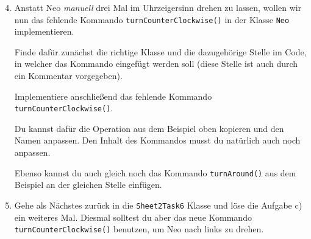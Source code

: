 \begin{enumerate} \setcounter{enumi}{3}
    \item Anstatt Neo \textit{manuell} drei Mal im Uhrzeigersinn drehen zu lassen, wollen wir nun das fehlende Kommando \lstinline{turnCounterClockwise()} in der Klasse \lstinline{Neo} implementieren.

        Finde dafür zunächst die richtige Klasse und die dazugehörige Stelle im Code, in welcher das Kommando eingefügt werden soll (diese Stelle ist auch durch ein Kommentar vorgegeben).

        Implementiere anschließend das fehlende Kommando \lstinline{turnCounterClockwise()}.
        
        Du kannst dafür die Operation aus dem Beispiel oben kopieren und den Namen anpassen.
        Den Inhalt des Kommandos musst du natürlich auch noch anpassen.

        Ebenso kannst du auch gleich noch das Kommando \lstinline{turnAround()} aus dem Beispiel an der gleichen Stelle einfügen.

    \item Gehe als Nächstes zurück in die \lstinline{Sheet2Task6} Klasse und löse die Aufgabe c) ein weiteres Mal.
        Diesmal solltest du aber das neue Kommando \lstinline{turnCounterClockwise()} benutzen, um Neo nach links zu drehen.
\end{enumerate}


